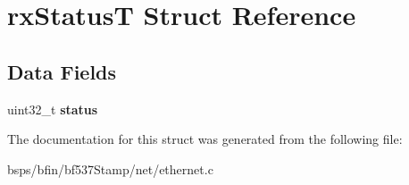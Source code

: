 \hypertarget{structrxStatusT}{}\section{rx\+StatusT Struct Reference}
\label{structrxStatusT}
\subsection*{Data Fields}
\begin{DoxyCompactItemize}
\item 
\mbox{\label{structrxStatusT_a012da04edd2fd26f7ff44c9e90f85afc}} 
uint32\+\_\+t {\bfseries status}
\end{DoxyCompactItemize}


The documentation for this struct was generated from the following file\+:\begin{DoxyCompactItemize}
\item 
bsps/bfin/bf537\+Stamp/net/ethernet.\+c\end{DoxyCompactItemize}
